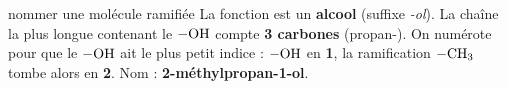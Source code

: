\documentclass[11pt,a4paper]{article}
\newcommand{\rep}[1]{\textcolor{primarydark}{\textbf{#1}}}
\begin{document}
\begin{corr}{nommer une molécule ramifiée}
La fonction est un \textbf{alcool} (suffixe \textit{-ol}). La chaîne la plus longue contenant le $\ce{-OH}$ compte \textbf{3 carbones} (propan-). On numérote pour que le $\ce{-OH}$ ait le plus petit indice : $\ce{-OH}$ en \textbf{1}, la ramification $\ce{-CH3}$ tombe alors en \textbf{2}. Nom : \rep{2-méthylpropan-1-ol}.
\end{corr}
\end{document}
